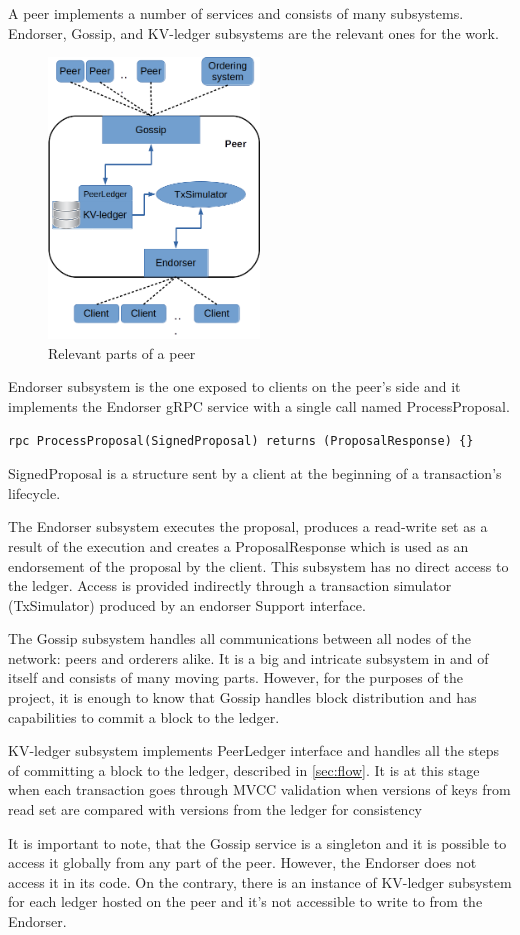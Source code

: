 A peer implements a number of services and consists of many subsystems. Endorser, Gossip, and KV-ledger subsystems are the relevant ones for the work.

\begin{figure}[hp]
\begin{center}
\includegraphics[width=0.5\textwidth]{figures/peer}
\end{center}
\caption{Relevant parts of a peer}
\label{fig:peer}
\end{figure}

Endorser subsystem is the one exposed to clients on the peer's side and it implements the Endorser gRPC service with a single call named ProcessProposal.
\begin{lstlisting}
rpc ProcessProposal(SignedProposal) returns (ProposalResponse) {}
\end{lstlisting}
SignedProposal is a structure sent by a client at the beginning of a transaction's lifecycle.

The Endorser subsystem executes the proposal, produces a read-write set as a result of the execution and creates a ProposalResponse which is used as an endorsement of the proposal by the client.  This subsystem has no direct access to the ledger. Access is provided indirectly through a transaction simulator (TxSimulator) produced by an endorser Support interface.

The Gossip subsystem handles all communications between all nodes of the network: peers and orderers alike. It is a big and intricate subsystem in and of itself and consists of many moving parts. However, for the purposes of the project, it is enough to know that Gossip handles block distribution and has capabilities to commit a block to the ledger.

KV-ledger subsystem implements PeerLedger interface and handles all the steps of committing a block to the ledger, described in \ref{sec:flow}. It is at this stage when each transaction goes through MVCC validation when versions of keys from read set are compared with versions from the ledger for consistency

It is important to note, that the Gossip service is a singleton and it is possible to access it globally from any part of the peer. However, the Endorser does not access it in its code. On the contrary, there is an instance of KV-ledger subsystem for each ledger hosted on the peer and it's not accessible to write to from the Endorser.

